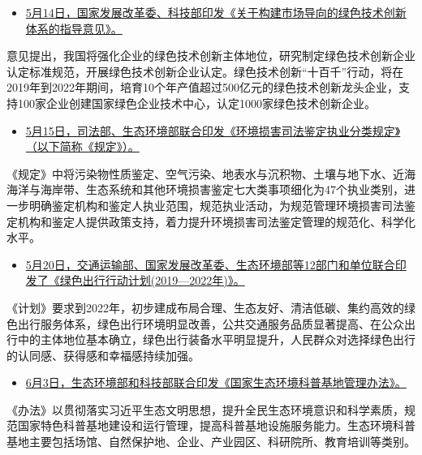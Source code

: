 \documentclass[
]{book}
\providecommand{\tightlist}{%
  \setlength{\itemsep}{0pt}\setlength{\parskip}{0pt}}
\begin{document}
\begin{itemize}
\tightlist
\item
  \href{http://www.gov.cn/xinwen/2019-05/14/content_5391394.htm}{5月14日，国家发展改革委、科技部印发《关于构建市场导向的绿色技术创新体系的指导意见》。}
\end{itemize}

意见提出，我国将强化企业的绿色技术创新主体地位，研究制定绿色技术创新企业认定标准规范，开展绿色技术创新企业认定。绿色技术创新``十百千''行动，将在2019年到2022年期间，培育10个年产值超过500亿元的绿色技术创新龙头企业，支持100家企业创建国家绿色企业技术中心，认定1000家绿色技术创新企业。

\begin{itemize}
\tightlist
\item
  \href{http://www.moj.gov.cn/government_public/content/2019-05/15/tzwj_234898.html}{5月15日，司法部、生态环境部联合印发《环境损害司法鉴定执业分类规定》（以下简称《规定》）。}
\end{itemize}

《规定》中将污染物性质鉴定、空气污染、地表水与沉积物、土壤与地下水、近海海洋与海岸带、生态系统和其他环境损害鉴定七大类事项细化为47个执业类别，进一步明确鉴定机构和鉴定人执业范围，规范执业活动，为规范管理环境损害司法鉴定机构和鉴定人提供政策支持，着力提升环境损害司法鉴定管理的规范化、科学化水平。

\begin{itemize}
\tightlist
\item
  \href{http://www.gov.cn/xinwen/2019-06/03/content_5397034.htm}{5月20日，交通运输部、国家发展改革委、生态环境部等12部门和单位联合印发了《绿色出行行动计划(2019---2022年)》。}
\end{itemize}

《计划》要求到2022年，初步建成布局合理、生态友好、清洁低碳、集约高效的绿色出行服务体系，绿色出行环境明显改善，公共交通服务品质显著提高、在公众出行中的主体地位基本确立，绿色出行装备水平明显提升，人民群众对选择绿色出行的认同感、获得感和幸福感持续加强。

\begin{itemize}
\tightlist
\item
  \href{http://www.mee.gov.cn/xxgk2018/xxgk/xxgk04/201906/t20190612_706326.html}{6月3日，生态环境部和科技部联合印发《国家生态环境科普基地管理办法》。}
\end{itemize}

《办法》以贯彻落实习近平生态文明思想，提升全民生态环境意识和科学素质，规范国家特色科普基地建设和运行管理，提高科普基地设施服务能力。生态环境科普基地主要包括场馆、自然保护地、企业、产业园区、科研院所、教育培训等类别。
\end{document}
